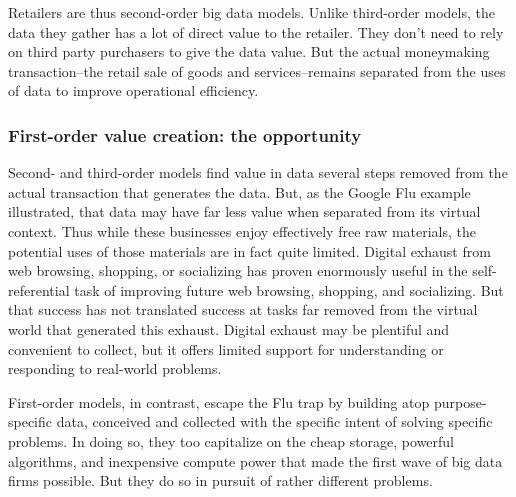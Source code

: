 \documentclass[12pt]{article}
\begin{document}
Retailers are thus second-order big data models. Unlike third-order
models, the data they gather has a lot of direct value to the
retailer. They don't need to rely on third party purchasers to give
the data value. But the actual moneymaking transaction--the retail
sale of goods and services--remains separated from the uses of data to
improve operational efficiency. 



\subsubsection{First-order value creation: the opportunity}
\label{sec:first-order-value}

Second- and third-order models find value in data
several steps removed from the actual transaction that generates the
data. But, as the Google Flu example illustrated, that data may have
far less value when separated from its virtual context. Thus while
these businesses enjoy effectively free raw materials, the potential
uses of those materials are in fact quite limited. Digital exhaust
from web browsing, shopping, or socializing has proven enormously
useful in the self-referential task of improving future web browsing, shopping, and
socializing. But that success has not translated success at tasks far
removed from the virtual world that generated this exhaust. Digital
exhaust may be plentiful and convenient to collect, but it offers
limited support for understanding or responding to real-world problems.

First-order models, in contrast, escape the Flu trap by building atop
purpose-specific data, conceived and collected with the specific
intent of solving specific problems. In doing so, they too capitalize
on the cheap storage, powerful algorithms, and inexpensive compute
power that made the first wave of big data firms possible. But they do
so in pursuit of rather different problems.
\end{document}
